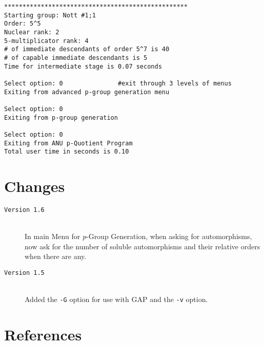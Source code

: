 \documentclass[12pt]{article}
\begin{document}
\begin{verbatim}
**************************************************
Starting group: Nott #1;1
Order: 5^5
Nuclear rank: 2
5-multiplicator rank: 4
# of immediate descendants of order 5^7 is 40
# of capable immediate descendants is 5
Time for intermediate stage is 0.07 seconds

Select option: 0               #exit through 3 levels of menus
Exiting from advanced p-group generation menu

Select option: 0
Exiting from p-group generation

Select option: 0
Exiting from ANU p-Quotient Program
Total user time in seconds is 0.10
\end{verbatim}

\section{Changes}
\begin{description}
  \item[\texttt{Version 1.6}]\ \\
     In main Menu for {\it p}-Group Generation, when asking for 
     automorphisms, now ask for the number of soluble automorphisms
     and their relative orders when there are any.
  \item[\texttt{Version 1.5}]\ \\
     Added the \texttt{-G} option for use with \textsf{GAP} and the
     \texttt{-v} option.
\end{description}
\pagebreak
\section*{\centering References}
\end{document}
